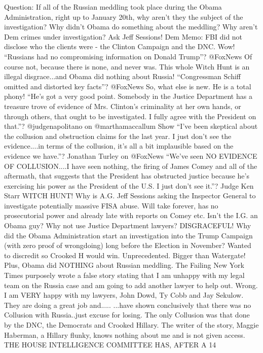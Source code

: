 Question: If all of the Russian meddling took place during the Obama
Administration, right up to January 20th, why aren't they the subject of
the investigation? Why didn't Obama do something about the meddling? Why
aren't Dem crimes under investigation? Ask Jeff Sessions! Dem Memo: FBI
did not disclose who the clients were - the Clinton Campaign and the
DNC. Wow! ``Russians had no compromising information on Donald Trump''?
@FoxNews Of course not, because there is none, and never was. This whole
Witch Hunt is an illegal disgrace...and Obama did nothing about Russia!
``Congressman Schiff omitted and distorted key facts''? @FoxNews So,
what else is new. He is a total phony! ``He's got a very good point.
Somebody in the Justice Department has a treasure trove of evidence of
Mrs. Clinton's criminality at her own hands, or through others, that
ought to be investigated. I fully agree with the President on that.''?
@judgenapolitano on @marthamaccallum Show ``I've been skeptical about
the collusion and obstruction claims for the last year. I just don't see
the evidence....in terms of the collusion, it's all a bit implausible
based on the evidence we have.''? Jonathan Turley on @FoxNews ``We've
seen NO EVIDENCE OF COLLUSION....I have seen nothing, the firing of
James Comey and all of the aftermath, that suggests that the President
has obstructed justice because he's exercising his power as the
President of the U.S. I just don't see it.''? Judge Ken Starr WITCH
HUNT! Why is A.G. Jeff Sessions asking the Inspector General to
investigate potentially massive FISA abuse. Will take forever, has no
prosecutorial power and already late with reports on Comey etc. Isn't
the I.G. an Obama guy? Why not use Justice Department lawyers?
DISGRACEFUL! Why did the Obama Administration start an investigation
into the Trump Campaign (with zero proof of wrongdoing) long before the
Election in November? Wanted to discredit so Crooked H would win.
Unprecedented. Bigger than Watergate! Plus, Obama did NOTHING about
Russian meddling. The Failing New York Times purposely wrote a false
story stating that I am unhappy with my legal team on the Russia case
and am going to add another lawyer to help out. Wrong. I am VERY happy
with my lawyers, John Dowd, Ty Cobb and Jay Sekulow. They are doing a
great job and..... ...have shown conclusively that there was no
Collusion with Russia..just excuse for losing. The only Collusion was
that done by the DNC, the Democrats and Crooked Hillary. The writer of
the story, Maggie Haberman, a Hillary flunky, knows nothing about me and
is not given access. THE HOUSE INTELLIGENCE COMMITTEE HAS, AFTER A 14
